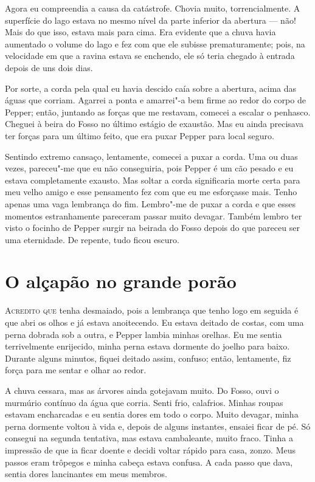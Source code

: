 Agora eu compreendia a causa da catástrofe. Chovia muito, torrencialmente. A superfície do lago estava no mesmo nível
da parte inferior da abertura --- não! Mais do que isso, estava mais para cima. Era evidente que a chuva havia aumentado o
volume do lago e fez com que ele subisse prematuramente; pois, na velocidade em que a ravina estava se enchendo, ele só
teria chegado à entrada depois de uns dois dias. 

Por sorte, a corda pela qual eu havia descido caía sobre a abertura, acima das águas que corriam. Agarrei a ponta e
amarrei"-a bem firme ao redor do corpo de Pepper; então, juntando as forças que me restavam, comecei a
escalar o penhasco. Cheguei à beira do Fosso no último estágio de exaustão. Mas eu ainda precisava ter forças para um
último feito, que era puxar Pepper para local seguro.

Sentindo extremo cansaço, lentamente, comecei a puxar a corda. Uma ou duas vezes, pareceu"-me que eu não conseguiria,
pois Pepper é um cão pesado e eu estava completamente exausto. Mas soltar a corda significaria morte certa para meu
velho amigo e esse pensamento fez com que eu me esforçasse mais. Tenho apenas uma vaga lembrança do fim. Lembro"-me de
puxar a corda e que esses momentos estranhamente pareceram passar muito devagar. Também lembro ter visto o focinho de
Pepper surgir na beirada do Fosso depois do que pareceu ser uma eternidade. De repente, tudo ficou escuro.


\clearpage

\chapter{O alçapão no grande porão}

\textsc{Acredito que} tenha desmaiado, pois a lembrança que tenho logo em seguida é que abri os olhos e já estava anoitecendo.
Eu estava deitado de costas, com uma perna dobrada sob a outra, e Pepper lambia minhas orelhas. Eu me sentia
terrivelmente enrijecido, minha perna estava dormente do joelho para baixo. Durante alguns minutos, fiquei deitado
assim, confuso; então, lentamente, fiz força para me sentar e olhar ao redor.

A chuva cessara, mas as árvores ainda gotejavam muito. Do Fosso, ouvi o murmúrio contínuo da água que corria. Senti
frio, calafrios. Minhas roupas estavam encharcadas e eu sentia dores em todo o corpo. Muito devagar, minha perna
dormente voltou à vida e, depois de alguns instantes, ensaiei ficar de pé. Só consegui na segunda tentativa, mas estava
cambaleante, muito fraco. Tinha a impressão de que ia ficar doente e decidi voltar rápido para casa, zonzo. Meus
passos eram trôpegos e minha cabeça estava confusa. A cada passo que dava, sentia dores lancinantes em meus membros.

